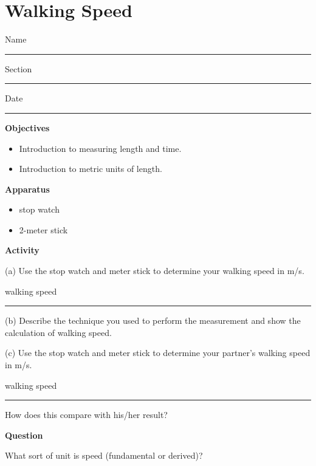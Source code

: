 
\section{Walking Speed}

Name \rule{2.0in}{0.1pt}\hfill{}Section \rule{1.0in}{0.1pt}\hfill{}Date \rule{1.0in}{0.1pt}

\textbf{Objectives}

\begin{itemize}
\item Introduction to measuring length and time.
\item Introduction to metric units of length. 
\end{itemize}
\textbf{Apparatus}

\begin{itemize}
\item stop watch
\item 2-meter stick
\end{itemize}
\textbf{Activity}

(a) Use the stop watch and meter stick to determine your walking speed in m/s.

walking speed \rule{2.0in}{0.1pt}

(b) Describe the technique you used to perform the measurement and show the calculation of walking speed.
\vspace{30mm}

(c) Use the stop watch and meter stick to determine your partner's walking speed in m/s.

walking speed \rule{2.0in}{0.1pt}  How does this compare with his/her result?
\vspace{20mm}

\textbf{Question}

What sort of unit is speed (fundamental or derived)?


